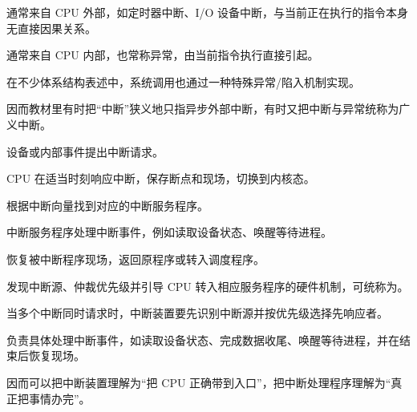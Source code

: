 \begin{points}
  \item {}通常来自 CPU 外部，如定时器中断、I/O 设备中断，与当前正在执行的指令本身无直接因果关系。
  \item {}通常来自 CPU 内部，也常称异常，由当前指令执行直接引起。
  \item 在不少体系结构表述中，系统调用也通过一种特殊异常/陷入机制实现。
  \item 因而教材里有时把“中断”狭义地只指异步外部中断，有时又把中断与异常统称为广义中断。
\end{points}


\begin{points}
  \item 设备或内部事件提出中断请求。
  \item CPU 在适当时刻响应中断，保存断点和现场，切换到内核态。
  \item 根据中断向量找到对应的中断服务程序。
  \item 中断服务程序处理中断事件，例如读取设备状态、唤醒等待进程。
  \item 恢复被中断程序现场，返回原程序或转入调度程序。
\end{points}

\begin{points}
  \item 发现中断源、仲裁优先级并引导 CPU 转入相应服务程序的硬件机制，可统称为。
  \item 当多个中断同时请求时，中断装置要先识别中断源并按优先级选择先响应者。
  \item {}负责具体处理中断事件，如读取设备状态、完成数据收尾、唤醒等待进程，并在结束后恢复现场。
  \item 因而可以把中断装置理解为“把 CPU 正确带到入口”，把中断处理程序理解为“真正把事情办完”。
\end{points}


